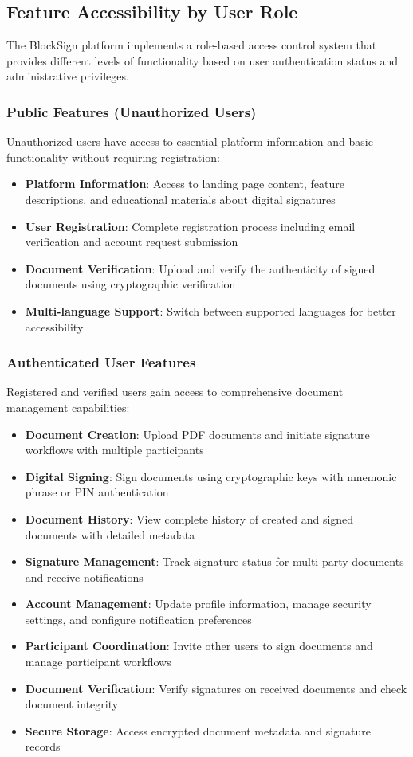 \subsection{Feature Accessibility by User Role}
The BlockSign platform implements a role-based access control system that provides different levels of functionality based on user authentication status and administrative privileges.

\subsubsection{Public Features (Unauthorized Users)}
Unauthorized users have access to essential platform information and basic functionality without requiring registration:

\begin{itemize}
    \item \textbf{Platform Information}: Access to landing page content, feature descriptions, and educational materials about digital signatures
    \item \textbf{User Registration}: Complete registration process including email verification and account request submission
    \item \textbf{Document Verification}: Upload and verify the authenticity of signed documents using cryptographic verification
    \item \textbf{Multi-language Support}: Switch between supported languages for better accessibility
\end{itemize}

\subsubsection{Authenticated User Features}
Registered and verified users gain access to comprehensive document management capabilities:

\begin{itemize}
    \item \textbf{Document Creation}: Upload PDF documents and initiate signature workflows with multiple participants
    \item \textbf{Digital Signing}: Sign documents using cryptographic keys with mnemonic phrase or PIN authentication
    \item \textbf{Document History}: View complete history of created and signed documents with detailed metadata
    \item \textbf{Signature Management}: Track signature status for multi-party documents and receive notifications
    \item \textbf{Account Management}: Update profile information, manage security settings, and configure notification preferences
    \item \textbf{Participant Coordination}: Invite other users to sign documents and manage participant workflows
    \item \textbf{Document Verification}: Verify signatures on received documents and check document integrity
    \item \textbf{Secure Storage}: Access encrypted document metadata and signature records
\end{itemize}

